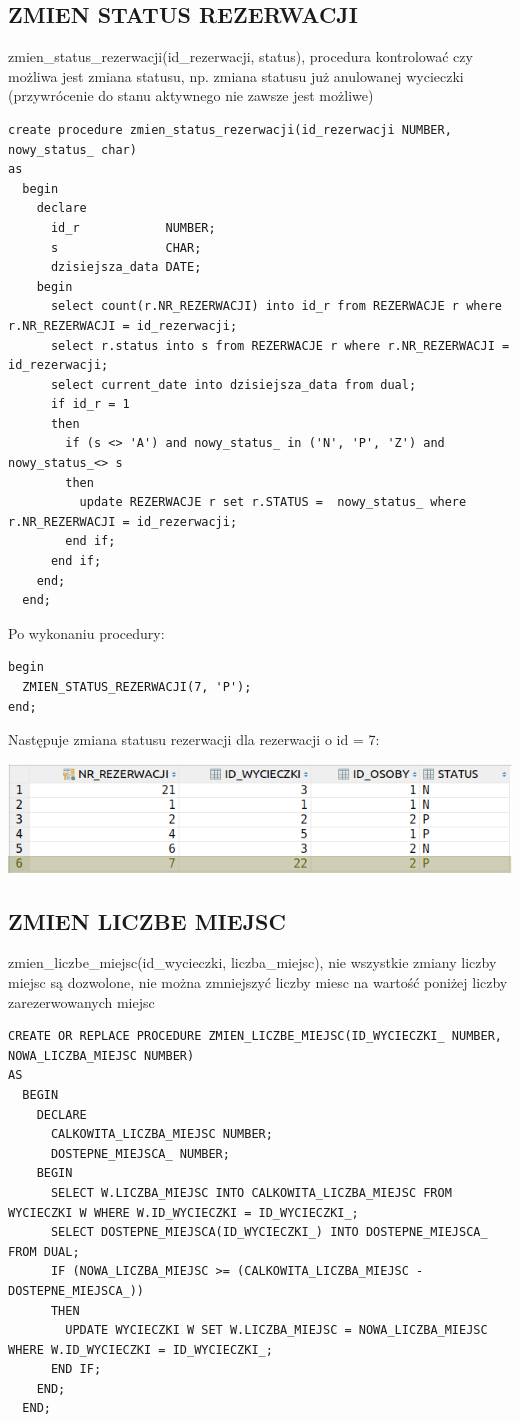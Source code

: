 \subsection{ZMIEN STATUS REZERWACJI}
zmien\_status\_rezerwacji(id\_rezerwacji, status), procedura kontrolować czy możliwa jest
zmiana statusu, np. zmiana statusu już anulowanej wycieczki (przywrócenie do stanu
aktywnego nie zawsze jest możliwe)

\begin{verbatim}
create procedure zmien_status_rezerwacji(id_rezerwacji NUMBER, nowy_status_ char)
as
  begin
    declare
      id_r            NUMBER;
      s               CHAR;
      dzisiejsza_data DATE;
    begin
      select count(r.NR_REZERWACJI) into id_r from REZERWACJE r where r.NR_REZERWACJI = id_rezerwacji;
      select r.status into s from REZERWACJE r where r.NR_REZERWACJI = id_rezerwacji;
      select current_date into dzisiejsza_data from dual;
      if id_r = 1
      then
        if (s <> 'A') and nowy_status_ in ('N', 'P', 'Z') and nowy_status_<> s
        then
          update REZERWACJE r set r.STATUS =  nowy_status_ where r.NR_REZERWACJI = id_rezerwacji;
        end if;
      end if;
    end;
  end;
\end{verbatim}

Po wykonaniu procedury:
\begin{verbatim}
begin
  ZMIEN_STATUS_REZERWACJI(7, 'P');
end;
\end{verbatim}
Następuje zmiana statusu rezerwacji dla rezerwacji o id = 7: 

\includegraphics[width=\linewidth]{./images/zmien_status_rezerwacji.png}

\subsection{ZMIEN LICZBE MIEJSC}
zmien\_liczbe\_miejsc(id\_wycieczki, liczba\_miejsc), nie wszystkie zmiany liczby miejsc są
dozwolone, nie można zmniejszyć liczby miesc na wartość poniżej liczby zarezerwowanych
miejsc
\begin{verbatim}
CREATE OR REPLACE PROCEDURE ZMIEN_LICZBE_MIEJSC(ID_WYCIECZKI_ NUMBER, NOWA_LICZBA_MIEJSC NUMBER)
AS
  BEGIN
    DECLARE
      CALKOWITA_LICZBA_MIEJSC NUMBER;
      DOSTEPNE_MIEJSCA_ NUMBER;
    BEGIN
      SELECT W.LICZBA_MIEJSC INTO CALKOWITA_LICZBA_MIEJSC FROM WYCIECZKI W WHERE W.ID_WYCIECZKI = ID_WYCIECZKI_;
      SELECT DOSTEPNE_MIEJSCA(ID_WYCIECZKI_) INTO DOSTEPNE_MIEJSCA_ FROM DUAL;
      IF (NOWA_LICZBA_MIEJSC >= (CALKOWITA_LICZBA_MIEJSC - DOSTEPNE_MIEJSCA_))
      THEN
        UPDATE WYCIECZKI W SET W.LICZBA_MIEJSC = NOWA_LICZBA_MIEJSC WHERE W.ID_WYCIECZKI = ID_WYCIECZKI_;
      END IF;
    END;
  END;
\end{verbatim}

